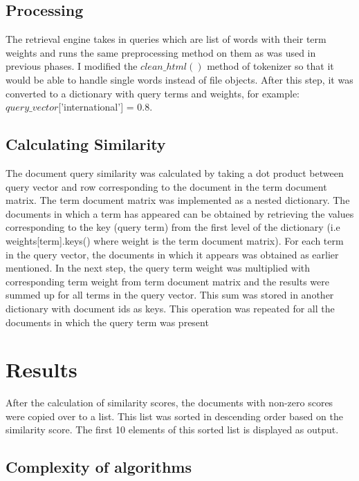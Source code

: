 \documentclass[paper=a4, fontsize=11pt]{scrartcl}
\numberwithin{equation}{section}		%
\numberwithin{figure}{section}			%
\numberwithin{table}{section}				%
\begin{document}
\subsection{Processing}

The retrieval engine takes in queries which are list of words with their term weights and runs the same preprocessing method on them as was used in previous phases. I modified the $clean\_html()$ method of tokenizer so that it would be able to handle single words instead of file objects. After this step, it was converted to a dictionary with query terms and weights, for example: $query\_vector$['international'] = 0.8.  

\subsection{Calculating Similarity}

The document query similarity was calculated by taking a dot product between query vector and row corresponding to the document in the term document matrix. The term document matrix was implemented as a nested dictionary. The documents in which a term has appeared can be obtained by retrieving the values corresponding to the key (query term) from the first level of the dictionary (i.e weights[term].keys() where weight is the term document matrix). For each term in the query vector, the documents in which it appears was obtained as earlier mentioned. In the next step, the query term weight was multiplied with corresponding term weight from term document matrix and the results were summed up for all terms in the query vector. This sum was stored in another dictionary with document ids as keys. This operation was repeated for all the documents in which the query term was present

\section{Results}

After the calculation of similarity scores, the documents with non-zero scores were copied over to a list. This list was sorted in descending order based on the similarity score. The first 10 elements of this sorted list is displayed as output.  

\subsection{Complexity of algorithms}
\end{document}
